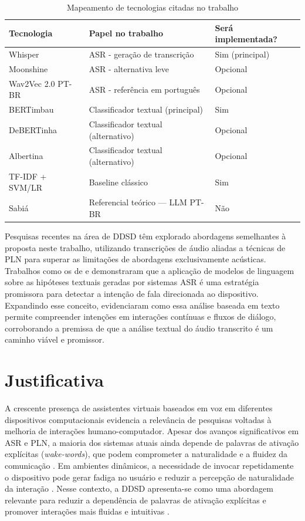 \documentclass[
    12pt,                %
    openright,           %
    oneside,             %
    a4paper,             %
    english,             %
    brazil               %
]{abntex2}
\begin{document}
\begin{table}[H]
\caption{Mapeamento de tecnologias citadas no trabalho}
\label{tab:tecnologias}
\begin{tabular}{lll}
\toprule
\textbf{Tecnologia} & \textbf{Papel no trabalho} & \textbf{Será implementada?} \\
\midrule
Whisper             & ASR - geração de transcrição     & Sim (principal) \\
Moonshine           & ASR - alternativa leve           & Opcional \\
Wav2Vec 2.0 PT-BR   & ASR - referência em português    & Opcional \\
BERTimbau           & Classificador textual (principal) & Sim \\
DeBERTinha          & Classificador textual (alternativo) & Opcional \\
Albertina           & Classificador textual (alternativo) & Opcional \\
TF-IDF + SVM/LR     & Baseline clássico                & Sim \\
Sabiá               & Referencial teórico — LLM PT-BR  & Não \\
\bottomrule
\end{tabular}
\end{table}

Pesquisas recentes na área de DDSD têm explorado abordagens semelhantes à proposta neste trabalho, utilizando transcrições de áudio aliadas a técnicas de PLN para superar as limitações de abordagens exclusivamente acústicas. Trabalhos como os de  e  demonstraram que a aplicação de modelos de linguagem sobre as hipóteses textuais geradas por sistemas ASR é uma estratégia promissora para detectar a intenção de fala direcionada ao dispositivo. Expandindo esse conceito,  evidenciaram como essa análise baseada em texto permite compreender intenções em interações contínuas e fluxos de diálogo, corroborando a premissa de que a análise textual do áudio transcrito é um caminho viável e promissor.

\section{Justificativa}
\label{sec:justificativa}

A crescente presença de assistentes virtuais baseados em voz em diferentes dispositivos computacionais evidencia a relevância de pesquisas voltadas à melhoria de interações humano-computador. Apesar dos avanços significativos em ASR e PLN, a maioria dos sistemas atuais ainda depende de palavras de ativação explícitas (\textit{wake-words}), que podem comprometer a naturalidade e a fluidez da comunicação \cite{Mallidi2018}. Em ambientes dinâmicos, a necessidade de invocar repetidamente o dispositivo pode gerar fadiga no usuário e reduzir a percepção de naturalidade da interação \cite{Nie2021}. Nesse contexto, a DDSD apresenta-se como uma abordagem relevante para reduzir a dependência de palavras de ativação explícitas e promover interações mais fluidas e intuitivas \cite{Wagner2024}.
\end{document}
